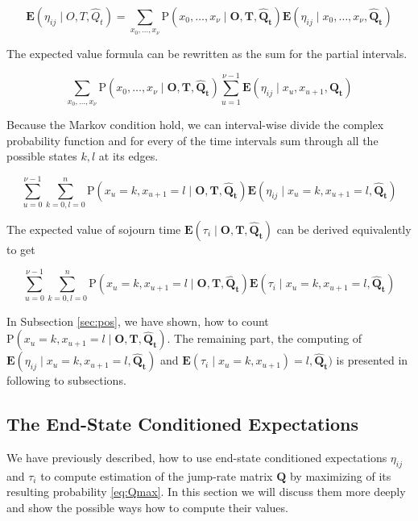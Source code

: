 \documentclass[thesis=M,english]{FITthesis}[2012/10/20]
\newcommand{\matr}[1]{\mathbf{#1}}
\begin{document}
\begin{equation} 
\mathbf{E}(\eta_{ij} \mid O,T, \hat Q_t ) = \sum_{x_0,\dots,x_\nu} \mathrm{P}(x_0,\dots,x_\nu \mid \matr{O},\matr{T}, \matr{ \hat Q_t }) \mathbf{E}(\eta_{ij} \mid x_0,\dots,x_\nu , \matr{\hat Q_t} )
\end{equation}

The expected value formula can be rewritten as the sum for the partial intervals.  

\begin{equation}
 \sum_{x_0,\dots,x_\nu} \mathrm{P}(x_0,\dots,x_\nu \mid \matr{O},\matr{T}, \matr{ \hat Q_t }) \sum_{u=1}^{\nu-1}\mathbf{E}(\eta_{ij} \mid x_u, x_{u+1} ,\matr{\hat Q_t} )
\end{equation}

Because the Markov condition hold, we can interval-wise divide the complex probability function and for every of the time intervals sum through all the possible states $k,l$ at its edges. 

\begin{equation}
\sum_{u=0}^{\nu-1} \sum_{k=0,l=0}^n \mathrm{P}( x_u = k, x_{u+1} = l \mid \matr{O},\matr{T}, \matr{ \hat Q_t }) \mathbf{E}(\eta_{ij} \mid x_u = k, x_{u+1} = l, \matr{ \hat Q_t } )
\end{equation}

The expected value of sojourn time $\mathbf{E}( \tau_i \mid \matr{O},\matr{T}, \matr{ \hat Q_t } )$ can be derived equivalently to get

\begin{equation}\label{eq:tau}
\sum_{u=0}^{\nu-1} \sum_{k=0,l=0}^n \mathrm{P}( x_u = k, x_{u+1} = l \mid \matr{O},\matr{T}, \matr{ \hat Q_t }) \mathbf{E}(\tau_i \mid x_u = k, x_{u+1} = l,\matr{\hat Q_t} )
\end{equation}

In Subsection \ref{sec:pos}, we have shown, how to count $\mathrm{P}(x_u = k,x_{u+1} = l \mid \matr{O},\matr{T}, \matr{ \hat Q_t })$. The remaining part, the computing of $\mathbf{E}(\eta_{ij} \mid x_u = k, x_{u+1} = l,\matr{\hat Q_t} )$ and $\mathbf{E}(\tau_i \mid x_u = k, x_{u+1}) = l, \matr{ \hat Q_t } )$ is presented in following to subsections. 

\subsection{The End-State Conditioned Expectations}\label{sec:endexp}

We have previously described, how to use end-state conditioned expectations $\eta_{ij}$ and $\tau_i$ to compute estimation of the jump-rate matrix $\matr{Q}$ by maximizing of its resulting probability \eqref{eq:Qmax}. In this section we will discuss them more deeply and show the possible ways how to compute their values.
\end{document}
